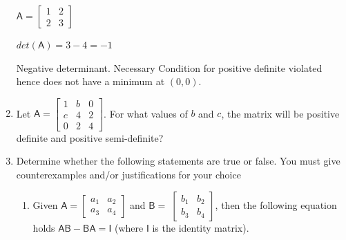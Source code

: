 \documentclass[answers, a4paper, 11pt]{exam}
\newcommand{\mat}[1]{\boldsymbol { \mathsf{#1}} }
\begin{document}
\begin{enumerate}
\begin{solution}
$ \mat A =
\begin{bmatrix}
    1 & 2 \\ 2 & 3
\end{bmatrix}
$

$det(\mat A) = 3 - 4 = -1$

Negative determinant. Necessary Condition for positive definite violated \cite{MM} hence does not have a minimum at $(0,0)$.

\end{solution}





\item Let $\mat A = \begin{bmatrix} 1 & b & 0 \\ c & 4 & 2 \\ 0 & 2 & 4 \end{bmatrix}$. For what values of $b$ and $c$, the matrix will be positive definite and positive semi-definite?

\begin{solution}


\end{solution}


\item Determine whether the following statements are true or false. You must give counterexamples and/or justifications for your choice


\begin{enumerate}
    \item Given 
        $
        \mat{A} = 
        \begin{bmatrix}
        a_1 & a_2 \\
        a_3 & a_4
        \end{bmatrix}$  and 
        $
        \mat{B} = \;
        \begin{bmatrix}
        b_1 & b_2 \\
        b_3 & b_4
        \end{bmatrix}$, then the following equation holds
        $\mat{AB} - \mat{BA} = \mat{I}$ (where $\mat{I}$ is the identity matrix).
	
    \begin{solution}
        \begin{itemize}


\end{itemize}
\end{solution}
\end{enumerate}
\end{enumerate}
\end{document}
